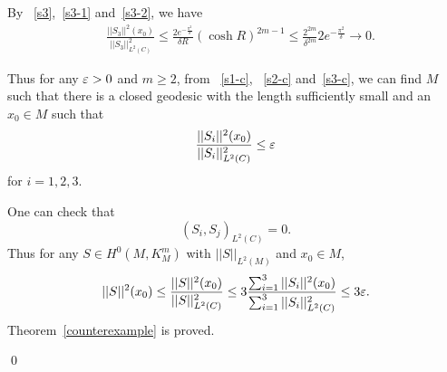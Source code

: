 By ~\eqref{s3},~\eqref{s3-1} and~\eqref{s3-2}, we have
\begin{align}\label{s3-c}
&\frac{||S_3||^2(x_0)}{||S_3||^2_{L^2(C)}}
\leq\frac{2e^{-\frac{\pi^2}{\delta}}}{\delta R}
(\cosh R)^{2m-1}
\leq \frac{2^{2m}}{\delta^{2m}}2e^{-\frac{\pi^2}{\delta}}
\rightarrow 0.
\end{align}

Thus for any $\varepsilon>0$ and $m\geq 2$,
from ~\eqref{s1-c}, ~\eqref{s2-c} and~\eqref{s3-c},
 we can find $M$ 
such that there is a closed geodesic with the length sufficiently small
and
an $x_0\in M$ such that
\[
\frac{||S_i||^2(x_0)}{||S_i||^2_{L^2(C)}}\leq\varepsilon
\]
for $i=1,2,3$.

One can check that 
\[
(S_i, S_j)_{L^2(C)}=0.
\]
Thus for any $S\in H^0(M,K_M^m)$ with $||S||_{L^2(M)}$ and
$x_0\in M$,
\[
||S||^2(x_0)\leq\frac{||S||^2(x_0)}{||S||^2_{L^2(C)}}
\leq 3\frac{\sum_{i=1}^3||S_i||^2(x_0)}
{\sum_{i=1}^3||S_i||^2_{L^2(C)}}\leq 3\varepsilon.
\]
Theorem~\ref{counterexample} is proved.

\qed
